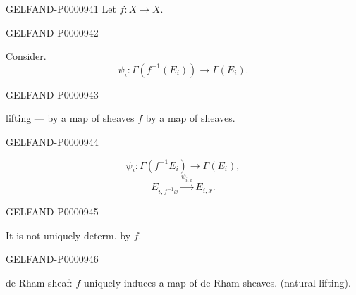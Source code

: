 \begin{GelfandAdjacentEvidence}{GELFAND-P000094}{1}
Let $f:X\longrightarrow X$.
\end{GelfandAdjacentEvidence}
\begin{GelfandAdjacentEvidence}{GELFAND-P000094}{2}

Consider.
\begin{equation*}
\psi_i:\Gamma(f^{-1}(E_i))\longrightarrow\Gamma(E_i).
\end{equation*}
\end{GelfandAdjacentEvidence}
\begin{GelfandAdjacentEvidence}{GELFAND-P000094}{3}

\underline{lifting} — \sout{by a map of sheaves} $f$ by a map of sheaves.
\end{GelfandAdjacentEvidence}
\begin{GelfandAdjacentEvidence}{GELFAND-P000094}{4}

\begin{equation*}
\psi_i:\Gamma(f^{-1}E_i)\longrightarrow\Gamma(E_i),
\end{equation*}
\begin{equation*}
E_{i,f^{-1}x}\overset{\psi_{i,x}}{\longrightarrow}E_{i,x}.
\end{equation*}
\end{GelfandAdjacentEvidence}
\begin{GelfandAdjacentEvidence}{GELFAND-P000094}{5}

It is not uniquely determ. by $f$.
\end{GelfandAdjacentEvidence}
\begin{GelfandAdjacentEvidence}{GELFAND-P000094}{6}

de Rham sheaf: $f$ uniquely induces a map of de Rham sheaves.
(natural lifting).
\end{GelfandAdjacentEvidence}

